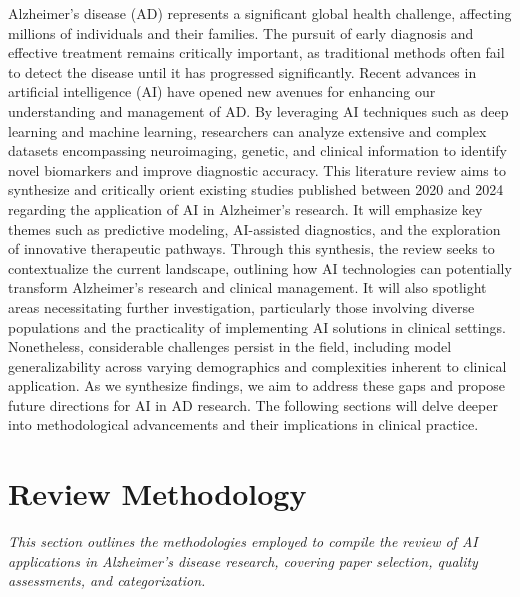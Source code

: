\documentclass{MITcsail}
\begin{document}
Alzheimer's disease (AD) represents a significant global health challenge, affecting millions of individuals and their families. The pursuit of early diagnosis and effective treatment remains critically important, as traditional methods often fail to detect the disease until it has progressed significantly. Recent advances in artificial intelligence (AI) have opened new avenues for enhancing our understanding and management of AD. By leveraging AI techniques such as deep learning and machine learning, researchers can analyze extensive and complex datasets encompassing neuroimaging, genetic, and clinical information to identify novel biomarkers and improve diagnostic accuracy. This literature review aims to synthesize and critically orient existing studies published between 2020 and 2024 regarding the application of AI in Alzheimer's research. It will emphasize key themes such as predictive modeling, AI-assisted diagnostics, and the exploration of innovative therapeutic pathways. Through this synthesis, the review seeks to contextualize the current landscape, outlining how AI technologies can potentially transform Alzheimer's research and clinical management. It will also spotlight areas necessitating further investigation, particularly those involving diverse populations and the practicality of implementing AI solutions in clinical settings. Nonetheless, considerable challenges persist in the field, including model generalizability across varying demographics and complexities inherent to clinical application. As we synthesize findings, we aim to address these gaps and propose future directions for AI in AD research. The following sections will delve deeper into methodological advancements and their implications in clinical practice.

\section{Review Methodology}

\textit{This section outlines the methodologies employed to compile the review of AI applications in Alzheimer's disease research, covering paper selection, quality assessments, and categorization.}
\end{document}
